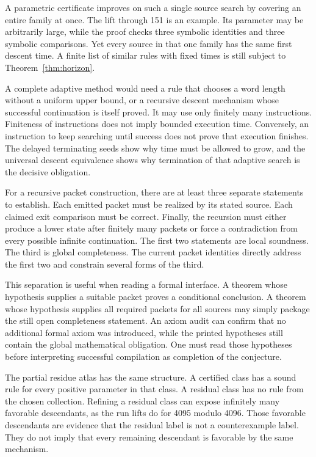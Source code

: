 A parametric certificate improves on such a single source search by covering an entire family at once. The lift through 151 is an example. Its parameter may be arbitrarily large, while the proof checks three symbolic identities and three symbolic comparisons. Yet every source in that one family has the same first descent time. A finite list of similar rules with fixed times is still subject to Theorem~\ref{thm:horizon}.

A complete adaptive method would need a rule that chooses a word length without a uniform upper bound, or a recursive descent mechanism whose successful continuation is itself proved. It may use only finitely many instructions. Finiteness of instructions does not imply bounded execution time. Conversely, an instruction to keep searching until success does not prove that execution finishes. The delayed terminating seeds show why time must be allowed to grow, and the universal descent equivalence shows why termination of that adaptive search is the decisive obligation.

For a recursive packet construction, there are at least three separate statements to establish. Each emitted packet must be realized by its stated source. Each claimed exit comparison must be correct. Finally, the recursion must either produce a lower state after finitely many packets or force a contradiction from every possible infinite continuation. The first two statements are local soundness. The third is global completeness. The current packet identities directly address the first two and constrain several forms of the third.

This separation is useful when reading a formal interface. A theorem whose hypothesis supplies a suitable packet proves a conditional conclusion. A theorem whose hypothesis supplies all required packets for all sources may simply package the still open completeness statement. An axiom audit can confirm that no additional formal axiom was introduced, while the printed hypotheses still contain the global mathematical obligation. One must read those hypotheses before interpreting successful compilation as completion of the conjecture.

The partial residue atlas has the same structure. A certified class has a sound rule for every positive parameter in that class. A residual class has no rule from the chosen collection. Refining a residual class can expose infinitely many favorable descendants, as the run lifts do for 4095 modulo 4096. Those favorable descendants are evidence that the residual label is not a counterexample label. They do not imply that every remaining descendant is favorable by the same mechanism.

